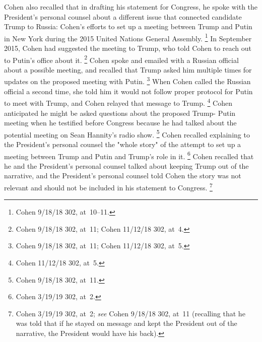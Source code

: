 {Cohen also recalled that in drafting his statement for Congress, he spoke with the President's personal counsel about a different issue that connected candidate Trump to Russia: Cohen's efforts to set up a meeting between Trump and Putin in New York during the 2015 United Nations General Assembly.%
\footnote{Cohen 9/18/18 302, at~10--11.}
In September 2015, Cohen had suggested the meeting to Trump, who told Cohen to reach out to Putin's office about it.%
\footnote{Cohen 9/18/18 302, at~11;
Cohen 11/12/18 302, at~4.}
Cohen spoke and emailed with a Russian official about a possible meeting, and recalled that Trump asked him multiple times for updates on the proposed meeting with Putin.%
\footnote{Cohen 9/18/18 302, at~11;
Cohen 11/12/18 302, at~5.}
When Cohen called the Russian official a second time, she told him it would not follow proper protocol for Putin to meet with Trump, and Cohen relayed that message to Trump.%
\footnote{Cohen 11/12/18 302, at~5.}
Cohen anticipated he might be asked questions about the proposed Trump- Putin meeting when he testified before Congress because he had talked about the potential meeting on Sean Hannity's radio show.%
\footnote{Cohen 9/18/18 302, at~11.}
Cohen recalled explaining to the President's personal counsel the "whole story" of the attempt to set up a meeting between Trump and Putin and Trump's role in it.%
\footnote{Cohen 3/19/19 302, at~2.}
Cohen recalled that he and the President's personal counsel talked about keeping Trump out of the narrative, and the President's personal counsel told Cohen the story was not relevant and should not be included in his statement to Congress.%
\footnote{Cohen 3/19/19 302, at~2;
\textit{see} Cohen 9/18/18 302, at~11 (recalling that he was told that if he stayed on message and kept the President out of the narrative, the President would have his back).}

}
